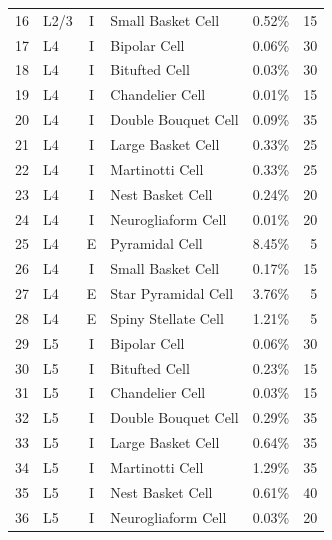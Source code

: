 \begin{longtable}{clclrr}
16  &      L2/3     &      I    &       Small Basket Cell       &      0.52\%       &   15  \\
17  &      L4   &      I    &      Bipolar Cell         &      0.06\%       &   30  \\
18  &      L4   &      I    &      Bitufted Cell        &      0.03\%       &   30  \\
19  &      L4   &      I    &      Chandelier Cell      &      0.01\%       &   15  \\
20  &      L4   &      I    &      Double Bouquet Cell      &      0.09\%       &   35  \\
21  &      L4   &      I    &      Large Basket Cell        &      0.33\%       &   25  \\
22  &      L4   &      I    &      Martinotti Cell      &      0.33\%       &   25  \\
23  &      L4   &      I    &      Nest Basket Cell         &      0.24\%       &   20  \\
24  &      L4   &      I    &      Neurogliaform Cell       &      0.01\%       &   20  \\
25  &      L4   &      E    &      Pyramidal Cell       &      8.45\%       &   5   \\
26  &      L4   &      I    &      Small Basket Cell        &      0.17\%       &   15  \\
27  &      L4   &      E    &      Star Pyramidal Cell      &      3.76\%       &   5   \\
28  &      L4   &      E    &      Spiny Stellate Cell      &      1.21\%       &   5   \\
29  &      L5   &      I    &      Bipolar Cell         &      0.06\%       &   30  \\
30  &      L5   &      I    &      Bitufted Cell        &      0.23\%       &   15  \\
31  &      L5   &      I    &      Chandelier Cell      &      0.03\%       &   15  \\
32  &      L5   &      I    &      Double Bouquet Cell      &      0.29\%       &   35  \\
33  &      L5   &      I    &      Large Basket Cell        &      0.64\%       &   35  \\
34  &      L5   &      I    &      Martinotti Cell      &      1.29\%       &   35  \\
35  &      L5   &      I    &      Nest Basket Cell         &      0.61\%       &   40  \\
36  &      L5   &      I    &      Neurogliaform Cell       &      0.03\%       &   20  \\

\end{longtable}
